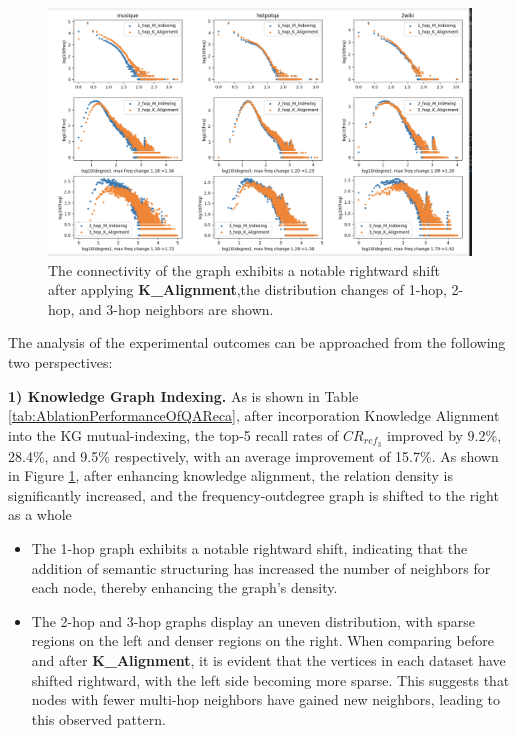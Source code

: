 \documentclass{article}
\begin{document}
\begin{figure}[htbp]
    \centering
    \includegraphics[width=0.8\linewidth]{figures/k_alignment_vs_m_indexing.png}
    \caption{The connectivity of the graph exhibits a notable rightward shift after applying \textbf{K\_Alignment},the distribution changes of 1-hop, 2-hop, and 3-hop neighbors are shown.}
    \label{fig:k_alignment_vs_m_indexing}
\end{figure}

The analysis of the experimental outcomes can be approached from the following two perspectives:

\textbf{1) Knowledge Graph Indexing.} As is shown in Table \ref{tab:AblationPerformanceOfQAReca}, after incorporation Knowledge Alignment into the KG mutual-indexing, the top-5 recall rates of $CR_{ref_3}$ improved by 9.2\%, 28.4\%, and 9.5\% respectively, with an average improvement of 15.7\%. As shown in Figure \ref{fig:k_alignment_vs_m_indexing}, after enhancing knowledge alignment, the relation density is significantly increased, and the frequency-outdegree graph is shifted to the right as a whole 
\begin{itemize}
    \item The 1-hop graph exhibits a notable rightward shift, indicating that the addition of semantic structuring has increased the number of neighbors for each node, thereby enhancing the graph's density.
    \item  The 2-hop and 3-hop graphs display an uneven distribution, with sparse regions on the left and denser regions on the right. When comparing before and after \textbf{K\_Alignment}, it is evident that the vertices in each dataset have shifted rightward, with the left side becoming more sparse. This suggests that nodes with fewer multi-hop neighbors have gained  new neighbors, leading to this observed pattern.
\end{itemize}
    
\end{document}
